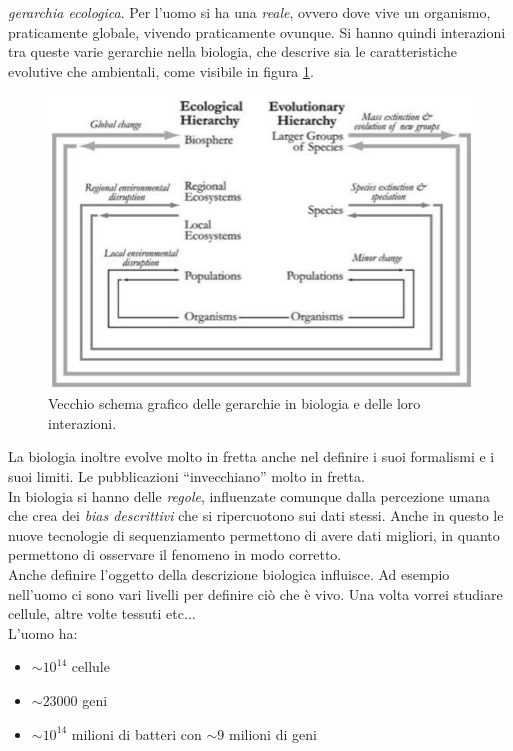 \documentclass[a4paper,12pt, oneside]{book}
\begin{document}
\textit{gerarchia ecologica}. Per l'uomo si
ha una \textit{reale}, ovvero dove vive un organismo, praticamente globale,
vivendo praticamente ovunque. Si hanno quindi interazioni tra queste varie
gerarchie nella biologia, che descrive sia le caratteristiche evolutive che
ambientali, come visibile in figura \ref{fig:ger}. \\
\begin{figure}
  \centering
  \includegraphics[scale = 0.4]{img/ger.jpg}
  \caption{Vecchio schema grafico delle gerarchie in biologia e delle loro
    interazioni.}
  \label{fig:ger}
\end{figure}
La biologia inoltre evolve molto in fretta anche nel definire i suoi formalismi
e i suoi limiti. Le pubblicazioni ``invecchiano'' molto in fretta.\\
In biologia si hanno delle \textit{regole}, influenzate comunque dalla
percezione umana che crea dei \textit{bias descrittivi} che si ripercuotono sui
dati stessi. Anche in questo le nuove tecnologie di sequenziamento permettono di
avere dati migliori, in quanto permettono di osservare il fenomeno in modo
corretto. \\
Anche definire l'oggetto della descrizione biologica influisce. Ad esempio
nell'uomo ci sono vari livelli per definire ciò che è vivo. Una volta vorrei
studiare cellule, altre volte tessuti etc$\ldots$ \\
L'uomo ha:
\begin{itemize}
  \item $\sim 10^{14}$ cellule
  \item $\sim 23000$ geni
  \item $\sim 10^{14}$ milioni di batteri con $\sim 9$ milioni di geni
\end{itemize}
\end{document}
